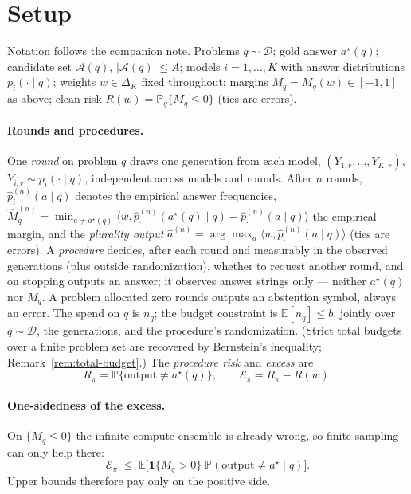 \documentclass[11pt]{article}
\newcommand{\A}{\mathcal A}
\newcommand{\D}{\mathcal D}
\newcommand{\DeltaK}{\Delta_K}
\newcommand{\E}{\mathbb E}
\newcommand{\Pp}{\mathbb P}
\newcommand{\one}{\mathbf 1}
\newcommand{\wfix}{w}
\newcommand{\Mhat}{\widehat M}
\begin{document}
\section{Setup}
\label{sec:setup}

Notation follows the companion note.  Problems $q\sim\D$; gold answer
$a^\star(q)$; candidate set $\A(q)$, $|\A(q)|\le A$; models $i=1,\dots,K$
with answer distributions $p_i(\cdot\mid q)$; weights $\wfix\in\DeltaK$
fixed throughout; margins $M_q=M_q(\wfix)\in[-1,1]$ as above; clean risk
$R(\wfix)=\Pp_q\{M_q\le0\}$ (ties are errors).

\paragraph{Rounds and procedures.}
One \emph{round} on problem $q$ draws one generation from each model,
$(Y_{1,r},\dots,Y_{K,r})$, $Y_{i,r}\sim p_i(\cdot\mid q)$, independent
across models and rounds.  After $n$ rounds, $\widehat p^{(n)}_i(a\mid q)$
denotes the empirical answer frequencies,
$\Mhat^{(n)}_q=\min_{a\ne a^\star(q)}\langle\wfix,\widehat
p^{(n)}_\cdot(a^\star(q)\mid q)-\widehat p^{(n)}_\cdot(a\mid q)\rangle$
the empirical margin, and the \emph{plurality output}
$\widehat a^{(n)}=\arg\max_a\langle \wfix,\widehat p^{(n)}_\cdot(a\mid
q)\rangle$ (ties are errors).  A \emph{procedure} decides, after each round
and measurably in the observed generations (plus outside randomization),
whether to request another round, and on stopping outputs an answer; it
observes answer strings only --- neither $a^\star(q)$ nor $M_q$.  A problem
allocated zero rounds outputs an abstention symbol, always an error.  The
spend on $q$ is $n_q$; the budget constraint is
$\E[n_q]\le b$, jointly over $q\sim\D$, the generations, and the
procedure's randomization.  (Strict total budgets over a finite problem set
are recovered by Bernstein's inequality; Remark~\ref{rem:total-budget}.)
The \emph{procedure risk} and \emph{excess} are
\[
R_\pi=\Pp\{\text{output}\ne a^\star(q)\},
\qquad
\mathcal E_\pi=R_\pi-R(\wfix).
\]

\paragraph{One-sidedness of the excess.}
On $\{M_q\le0\}$ the infinite-compute ensemble is already wrong, so finite
sampling can only help there:
\begin{equation}
\label{eq:onesided}
\mathcal E_\pi
\;\le\;
\E\big[\one\{M_q>0\}\;\Pp(\text{output}\ne a^\star\mid q)\big].
\end{equation}
Upper bounds therefore pay only on the positive side.
\end{document}
